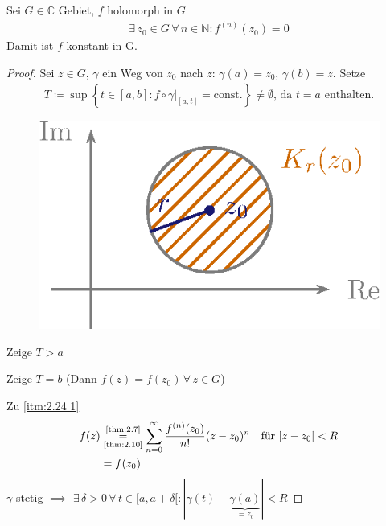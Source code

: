 \documentclass[a4paper,10pt]{scrbook}
\begin{document}
\begin{theorem}[Satz] \label{thm:2.24}
  Sei $G \in \mathbb{C}$ Gebiet, $f$ holomorph in $G$
  \begin{align*}
    \exists \, z_0 \in G \, \forall \, n \in \mathbb{N} : f^{(n)}(z_0) = 0
  \end{align*}
  Damit ist $f$ konstant in G.

  \begin{proof}
    Sei $z \in G$, $\gamma$ ein Weg von $z_0$ nach $z$: $\gamma(a) = z_0$, $\gamma(b) = z$. Setze
    \begin{align*}
      T \coloneq \sup \left\{ t \in [a,b] : f \circ \gamma \Big|_{[a,t]} = \text{const.} \right\} \neq \emptyset \text{, da $t=a$ enthalten.}
    \end{align*}

    \begin{figure}[H]
      \centering
      \includegraphics[scale=0.2]{images/ana3-tmp-22}
    \end{figure}

    \begin{enum-arab}
      \item \label{itm:2.24 1} Zeige $T > a$

      \item \label{itm:2.24 2} Zeige $T = b$ (Dann $f(z) = f(z_0) \, \forall \, z \in G$)
    \end{enum-arab}

    Zu \ref{itm:2.24 1}
    \begin{align*}
      f(z) &\overset{\text{\ref{thm:2.7}}}{\underset{\text{\ref{thm:2.10}}}{=}} \sum\limits_{n=0}^{\infty} \frac{f^{(n)}(z_0)}{n!} (z-z_0)^n \quad \text{für } |z-z_0| < R \\
      &= f(z_0)
    \end{align*}
    $\gamma$ stetig $\implies$ $\exists \, \delta > 0 \, \forall \, t \in [a,a+\delta[ : |\gamma(t) - \underbrace{\gamma(a)}_{=z_0}| < R$


\end{proof}
\end{theorem}
\end{document}
